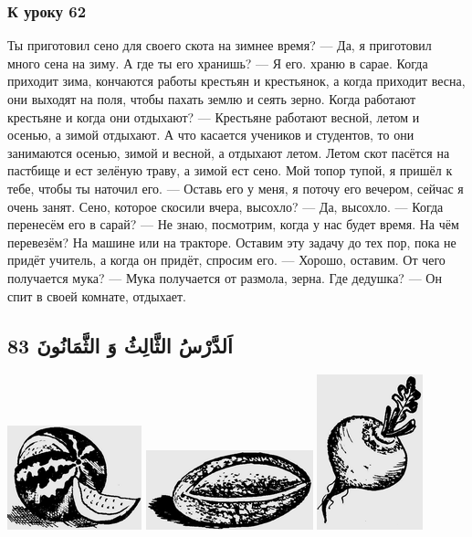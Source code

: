 \documentclass[a5paper]{article}
\begin{document}
\subsubsection{К уроку 62}
Ты приготовил сено для своего скота на зимнее время? — Да, я приготовил много сена на зиму. А где ты его хранишь? — Я его. храню в сарае. Когда приходит зима, кончаются работы крестьян и крестьянок, а когда приходит весна, они выходят на поля, чтобы пахать землю и сеять зерно. Когда работают крестьяне и когда они отдыхают? — Крестьяне работают весной, летом и осенью, а зимой отдыхают. А что касается учеников и студентов, то они занимаются осенью, зимой и весной, а отдыхают летом. Летом скот пасётся на пастбище и ест зелёную траву, а зимой ест сено. Мой топор тупой, я пришёл к тебе, чтобы ты наточил его. — Оставь его у меня, я поточу его вечером, сейчас я очень занят. Сено, которое скосили вчера, высохло? — Да, высохло. — Когда перенесём его в сарай? — Не знаю, посмотрим, когда у нас будет время. На чём перевезём? На машине или на тракторе. Оставим эту задачу до тех пор, пока не придёт учитель, а когда он придёт, спросим его. — Хорошо, оставим. От чего получается мука? — Мука получается от размола, зерна. Где дедушка? — Он спит в своей комнате, отдыхает.

\subsection{اَلدَّرْسُ الثَّالِثُ وَ الثَّمَانُونَ 83}
 \includegraphics[width=1.5311in,height=1.1874in]{MuhammadBagauddinlatinized-img236.png}   \includegraphics[width=1.9063in,height=0.9063in]{MuhammadBagauddinlatinized-img237.png}  \includegraphics[width=1.2083in,height=1.7709in]{MuhammadBagauddinlatinized-img238.png} 
\end{document}
